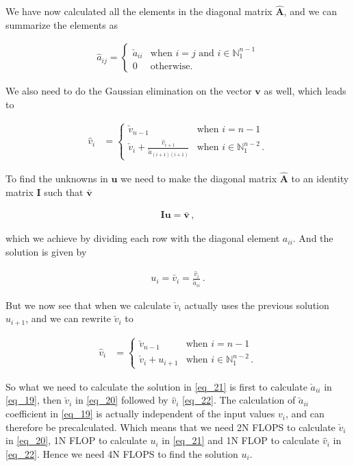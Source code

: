 \documentclass[11pt,english,a4paper]{article}
\begin{document}
\begin{flushleft}
We have now calculated all the elements in the diagonal matrix $\hat{\textbf{A}}$, and we can summarize the elements as

\begin{align*}
\hat{a}_{ij} = \begin{cases} \check{a}_{ii}  & \text{when } i=j \text{ and } i\in\mathbb{N}_{1}^{n-1} \\ 0 & \text{otherwise.} \end{cases}
\end{align*}

We also need to do the Gaussian elimination on the vector $\textbf{v}$ as well, which leads to

\begin{align*}
\hat{v}_i &= \begin{cases} \check{v}_{n-1} & \text{when $i=n-1$} \\ \check{v}_i + \frac{\hat{v}_{i+1}}{\check{a}_{(i+1)(i+1)}} & \text{when $i\in\mathbb{N}_1^{n-2}$}\,. \end{cases}
\end{align*}

To find the unknowns in $\textbf{u}$ we need to make the diagonal matrix $\hat{\textbf{A}}$ to an identity matrix $\textbf{I}$ such that $\bar{\textbf{v}}$

\begin{align*}
\textbf{I}\textbf{u} = \bar{\textbf{v}}\,,
\end{align*}

which we achieve by dividing each row with the diagonal element $a_{ii}$. And the solution is given by

\begin{align}
u_i = \bar{v}_i = \frac{\hat{v}_i}{\check{a}_{ii}} \,.
\label{eq_21}
\end{align}

But we now see that when we calculate $\check{v}_i$ actually uses the previous solution $u_{i+1}$, and we can rewrite $\check{v}_i$ to

\begin{align}
\hat{v}_i &= \begin{cases} \check{v}_{n-1} & \text{when $i=n-1$} \\ \check{v}_i + u_{i+1} & \text{when $i\in\mathbb{N}_1^{n-2}$}\,. \end{cases}
\label{eq_22}
\end{align}

So what we need to calculate the solution in \eqref{eq_21} is first to calculate $\check{a}_{ii}$ in \eqref{eq_19}, then $\check{v}_i$ in \eqref{eq_20} followed by $\hat{v}_i$ \eqref{eq_22}. The calculation of $\check{a}_{ii}$ coefficient in \eqref{eq_19} is actually independent of the input values $v_i$, and can therefore be precalculated. Which means that we need 2N FLOPS to calculate $\check{v}_i$ in \eqref{eq_20}, 1N FLOP to calculate $u_i$ in \eqref{eq_21} and 1N FLOP to calculate $\hat{v}_i$ in \eqref{eq_22}. Hence we need 4N FLOPS to find the solution $u_i$.
\linebreak


\end{flushleft}
\end{document}

